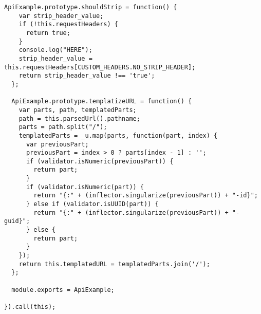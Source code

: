 \begin{lstlisting}[caption=lib/api\_example.js]
  ApiExample.prototype.shouldStrip = function() {
    var strip_header_value;
    if (!this.requestHeaders) {
      return true;
    }
    console.log("HERE");
    strip_header_value = this.requestHeaders[CUSTOM_HEADERS.NO_STRIP_HEADER];
    return strip_header_value !== 'true';
  };

  ApiExample.prototype.templatizeURL = function() {
    var parts, path, templatedParts;
    path = this.parsedUrl().pathname;
    parts = path.split("/");
    templatedParts = _u.map(parts, function(part, index) {
      var previousPart;
      previousPart = index > 0 ? parts[index - 1] : '';
      if (validator.isNumeric(previousPart)) {
        return part;
      }
      if (validator.isNumeric(part)) {
        return "{:" + (inflector.singularize(previousPart)) + "-id}";
      } else if (validator.isUUID(part)) {
        return "{:" + (inflector.singularize(previousPart)) + "-guid}";
      } else {
        return part;
      }
    });
    return this.templatedURL = templatedParts.join('/');
  };

  module.exports = ApiExample;

}).call(this);
\end{lstlisting}


